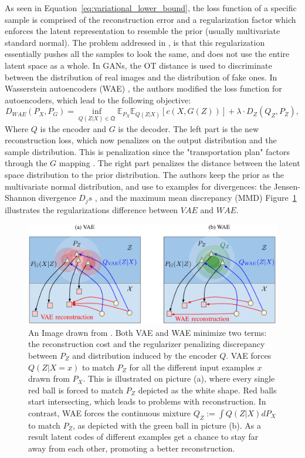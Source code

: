 \documentclass[graybox]{svmult}
\begin{document}
As seen in Equation~\ref{eq:variational_lower_bound}, the loss function of a specific sample is comprised of the reconstruction error and a regularization factor which enforces the latent representation to resemble the prior (usually multivariate standard normal). The problem addressed in \cite{Wasserstein_Autoencoders}, is that this regularization essentially pushes all the samples to look the same, and does not use the entire latent space as a whole.
In GANs, the OT distance is used to discriminate between the distribution of real images and the distribution of fake ones. In Wasserstein autoencoders (WAE) \cite{Wasserstein_Autoencoders}, the authors modified the loss function for autoencoders, which lead to the following objective:
\begin{equation}
    D_{WAE}(P_X, P_G)=\inf_{Q(Z|X)\in \mathfrak{Q}} \mathbb{E}_{P_X} \mathbb{E}_{Q(Z|X)}[c(X,G(Z))] +\lambda \cdot  D_Z(Q_Z,P_Z),
\end{equation}
Where $Q$ is the encoder and $G$ is the decoder.
The left part is the new reconstruction loss, which now penalizes on the output distribution and the sample distribution. This is penalization since the "transportation plan" factors through the $G$ mapping \cite{factoring_OT}. The right part penalizes the distance between the latent space distribution to the prior distribution. The authors keep the prior as the multivariate normal distribution, and use to examples for divergences: the Jensen-Shannon divergence $D_js$ \cite{JS}, and the maximum mean discrepancy (MMD) \cite{MMD}
Figure~\ref{fig:WAE} illustrates the regularizations difference between $VAE$ and $WAE$.

\begin{figure}
    \centering
    \includegraphics[scale=0.35]{WAE.PNG}
    \caption{An Image drawn from \cite{Wasserstein_Autoencoders}. Both VAE and WAE minimize two terms: the reconstruction cost and the regularizer penalizing discrepancy between $P_Z$ and distribution induced by the encoder $Q$. VAE forces $Q(Z|X = x)$ to match $P_Z$ for all the different input examples $x$ drawn from $P_X$. This is illustrated on picture (a), where every single red ball is forced to match $P_Z$ depicted as the white shape. Red balls start intersecting, which leads to problems with reconstruction. In contrast, WAE forces the continuous mixture $Q_Z := \int Q(Z|X)dP_X$ to match $P_Z$, as depicted with the green ball in picture (b). As a result latent codes of different examples get a chance to stay far away from each other, promoting a better reconstruction.
}
    \label{fig:WAE}
\end{figure}
\end{document}
